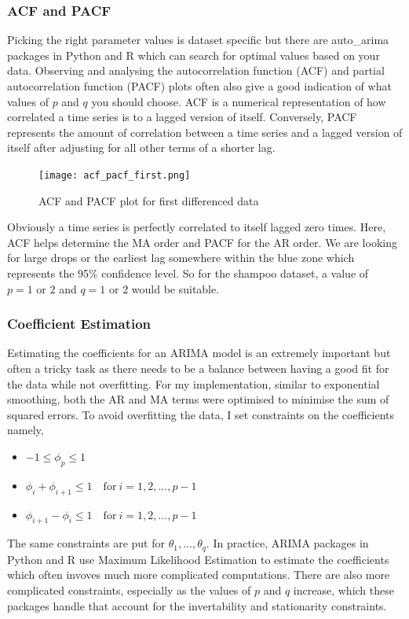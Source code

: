 \documentclass{article}
\begin{document}
  \subsubsection{ACF and PACF}
  Picking the right parameter values is dataset specific but there are auto\_arima packages in Python and R which can search for optimal values based on your data. Observing and analysing the autocorrelation function (ACF) and partial autocorrelation function (PACF) plots often also give a good indication of what values of $p$ and $q$ you should choose. ACF is a numerical representation of how correlated a time series is to a lagged version of itself. Conversely, PACF represents the amount of correlation between a time series and a lagged version of itself after adjusting for all other terms of a shorter lag.
  \begin{figure}[H]
    \centering
    \captionsetup{justification=centering}
    \texttt{[image: acf\_pacf\_first.png]}
    \caption{ACF and PACF plot for first differenced data}
  \end{figure}
  Obviously a time series is perfectly correlated to itself lagged zero times. Here, ACF helps determine the MA order and PACF for the AR order. We are looking for large drops or the earliest lag somewhere within the blue zone which represents the 95\% confidence level. So for the shampoo dataset, a value of $p=1\text{ or }2$ and $q=1\text{ or }2$ would be suitable.

  \subsubsection{Coefficient Estimation}
  Estimating the coefficients for an ARIMA model is an extremely important but often a tricky task as there needs to be a balance between having a good fit for the data while not overfitting. For my implementation, similar to exponential smoothing, both the AR and MA terms were optimised to minimise the sum of squared errors. To avoid overfitting the data, I set constraints on the coefficients namely,
  \begin{itemize}
    \item $-1 \leq \phi_p \leq 1$
    \item $\phi_i + \phi_{i+1} \leq 1 \quad \text{for} \ i=1,2,...,p-1$
    \item $\phi_{i+1} - \phi_i \leq 1 \quad \text{for} \ i=1,2,...,p-1$
  \end{itemize}
  
  The same constraints are put for $\theta_1,...,\theta_q$. In practice, ARIMA packages in Python and R use Maximum Likelihood Estimation to estimate the coefficients which often invoves much more complicated computations. There are also more complicated constraints, especially as the values of $p$ and $q$ increase, which these packages handle that account for the invertability and stationarity constraints.
\end{document}
